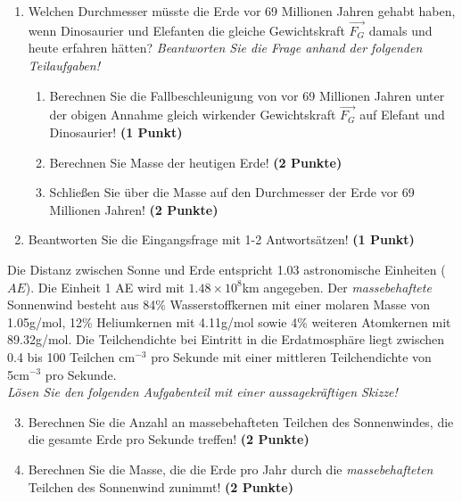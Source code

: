 \documentclass[a4paper, 9pt]{scrartcl}\usepackage[]{graphicx}\usepackage[]{xcolor}
\begin{document}
\begin{enumerate}
\item Welchen Durchmesser müsste die Erde vor 69 Millionen Jahren gehabt haben, wenn Dinosaurier und Elefanten die gleiche Gewichtskraft $\overrightarrow{F_G}$ damals und heute erfahren hätten? \textit{Beantworten Sie die Frage anhand der folgenden Teilaufgaben!}
\begin{enumerate}
\item Berechnen Sie die Fallbeschleunigung von vor 69 Millionen Jahren unter der obigen Annahme gleich wirkender Gewichtskraft $\overrightarrow{F_G}$ auf Elefant und Dinosaurier! \textbf{(1 Punkt)}
\item Berechnen Sie Masse der heutigen Erde! \textbf{(2 Punkte)}
\item Schließen Sie über die Masse auf den Durchmesser der Erde vor 69 Millionen Jahren! \textbf{(2 Punkte)}
\end{enumerate}
\item Beantworten Sie die Eingangsfrage mit 1-2 Antwortsätzen! \textbf{(1 Punkt)}
\end{enumerate}

Die Distanz zwischen Sonne und Erde entspricht 1.03 astronomische Einheiten ($AE$). Die Einheit 1 AE wird mit \ensuremath{1.48\times 10^{8}}km angegeben. Der \textit{massebehaftete} Sonnenwind besteht aus 84\% Wasserstoffkernen mit einer molaren Masse von 1.05g/mol, 12\% Heliumkernen mit 4.11g/mol sowie 4\% weiteren Atomkernen mit  89.32g/mol. Die Teilchendichte bei Eintritt in die Erdatmosphäre liegt zwischen 0.4 bis 100 Teilchen cm$^{-3}$ pro Sekunde mit einer mittleren Teilchendichte von 5cm$^{-3}$ pro Sekunde. \\

\textit{Lösen Sie den folgenden Aufgabenteil mit einer aussagekräftigen Skizze!}

\begin{enumerate}
  \setcounter{enumi}{2}
\item Berechnen Sie die Anzahl an massebehafteten Teilchen des Sonnenwindes, die die gesamte Erde pro Sekunde treffen! \textbf{(2 Punkte)}
\item Berechnen Sie die Masse, die die Erde pro Jahr durch die \textit{massebehafteten} Teilchen des Sonnenwind zunimmt! \textbf{(2 Punkte)}
\end{enumerate}
\end{document}
